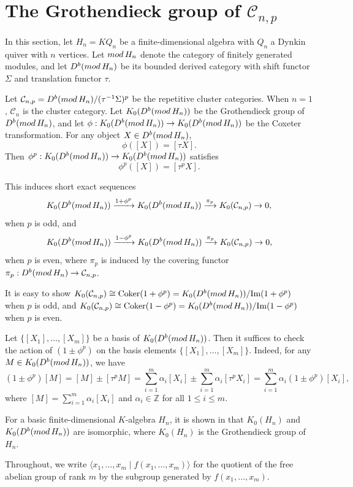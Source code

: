 \documentclass[a4paper,reqno,11pt]{amsart}
\theoremstyle{definition}
\def\C{\mathcal{C}}
\def \text{\mbox}
\renewcommand{\mod}{\mathop{\rm mod}\nolimits}%
\begin{document}
\section{The Grothendieck group of $\C_{n,p}$}

In this section, let  $H_n=KQ_n$ be a finite-dimensional algebra with $Q_n$ a Dynkin quiver with $n$ vertices. Let $\mod H_n$ denote the category of finitely generated modules, and let $D^b(\mod H_n)$ be its bounded derived category with shift functor $\Sigma$ and translation functor $\tau$.

Let $\C_{n,p}=D^b(\mod H_n)/(\tau^{-1}\Sigma)^p$ be the repetitive cluster categories. When $n=1$, $\C_{n}$ is the cluster category. Let $K_0(D^b(\mod H_n))$ be the Grothendieck group of $D^b(\mod H_n)$, and let $\phi: K_0(D^b(\mod H_n))\rightarrow K_0(D^b(\mod H_n))$ be the Coxeter transformation. For any object $X\in D^b(\mod H_n)$,
$$\phi([X])=[\tau X].$$
Then $\phi^p: K_0(D^b(\mod H_n))\rightarrow K_0(D^b(\mod H_n))$ satisfies
$$\phi^p([X])=[\tau^p X].$$

This induces short exact sequences
$$K_0(D^b(\mod H_n))\xrightarrow{1+\phi^p} K_0(D^b(\mod H_n))\xrightarrow{\pi_p} K_0(\C_{n,p})\rightarrow 0,$$
when $p$ is odd, and
$$K_0(D^b(\mod H_n))\xrightarrow{1-\phi^p} K_0(D^b(\mod H_n))\xrightarrow{\pi_p} K_0(\C_{n,p})\rightarrow 0,$$
when $p$ is even, where $\pi_p$ is induced by the covering functor $\pi_p:D^b(\mod H_n)\rightarrow \C_{n,p}$.

It is easy to show $K_0(\C_{n,p})\cong \text{Coker}(1+\phi^p)=K_0(D^b(\mod H_n))/\text{Im}(1+\phi^p)$ when $p$ is odd, and $K_0(\C_{n,p})\cong \text{Coker}(1-\phi^p)=K_0(D^b(\mod H_n))/\text{Im}(1-\phi^p)$ when $p$ is even.

Let $\{[X_1], \ldots, [X_m]\}$ be a basis of $K_0(D^b(\mod H_n))$. Then it suffices to check the action of $(1 \pm \phi^p)$ on the basis elements $\{[X_1], \ldots, [X_m]\}$.
Indeed, for any $M \in K_0(D^b(\mod H_n))$, we have
\[
(1 \pm \phi^p)[M] = [M] \pm [\tau^p M] = \sum_{i=1}^m \alpha_i [X_i] \pm \sum_{i=1}^m \alpha_i[\tau^p X_i] = \sum_{i=1}^m \alpha_i (1 \pm \phi^p)[X_i],
\]
where $[M] = \sum_{i=1}^m \alpha_i [X_i]$ and $\alpha_i \in \mathbb{Z}$ for all $1 \leq i \leq m$.
\vspace{2mm}

For a basic finite-dimensional $K$-algebra $H_n$, it is shown in \cite{Gr} that $K_0(H_n)$ and $K_0(D^b(\mod H_n))$ are isomorphic, where $K_0(H_n)$ is the Grothendieck group of $H_n$.

Throughout, we write $\langle x_1, \ldots, x_m \mid f(x_1,\ldots,x_m) \rangle$ for the quotient of the free abelian group of rank $m$ by the subgroup generated by $f(x_1,\ldots,x_m)$.
\end{document}

